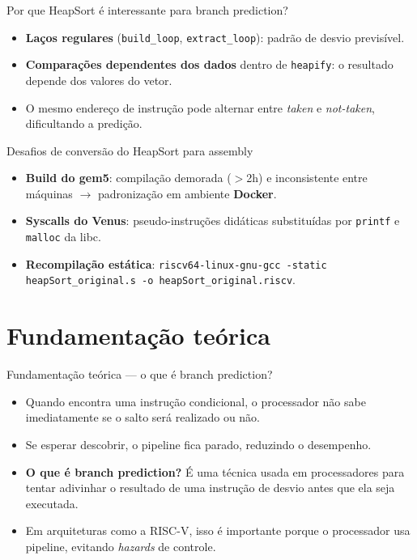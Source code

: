 \documentclass[aspectratio=169,11pt]{beamer}
\begin{document}
\begin{frame}{Por que HeapSort é interessante para branch prediction?}
  \begin{itemize}
    \item \textbf{Laços regulares} (\texttt{build\_loop}, \texttt{extract\_loop}):
          padrão de desvio previsível.
    \item \textbf{Comparações dependentes dos dados} dentro de \texttt{heapify}:
          o resultado depende dos valores do vetor.
    \item O mesmo endereço de instrução pode alternar entre \emph{taken} e
          \emph{not-taken}, dificultando a predição.
  \end{itemize}
\end{frame}

\begin{frame}{Desafios de conversão do HeapSort para assembly}
  \begin{itemize}
    \item \textbf{Build do gem5}: compilação demorada ($>$2h) e inconsistente
          entre máquinas $\rightarrow$ padronização em ambiente \textbf{Docker}.
    \item \textbf{Syscalls do Venus}: pseudo-instruções didáticas substituídas por
          \texttt{printf} e \texttt{malloc} da libc.
    \item \textbf{Recompilação estática}:
          \texttt{riscv64-linux-gnu-gcc -static heapSort\_original.s -o heapSort\_original.riscv}.
  \end{itemize}
\end{frame}

\section{Fundamentação teórica}

\begin{frame}{Fundamentação teórica --- o que é branch prediction?}
  \begin{itemize}
    \item Quando encontra uma instrução condicional, o processador não sabe
          imediatamente se o salto será realizado ou não.
    \item Se esperar descobrir, o pipeline fica parado, reduzindo o desempenho.
    \item \textbf{O que é branch prediction?} É uma técnica usada em
          processadores para tentar adivinhar o resultado de uma instrução de
          desvio antes que ela seja executada.
    \item Em arquiteturas como a RISC-V, isso é importante porque o
          processador usa pipeline, evitando \emph{hazards} de controle.
  \end{itemize}
\end{frame}
\end{document}

